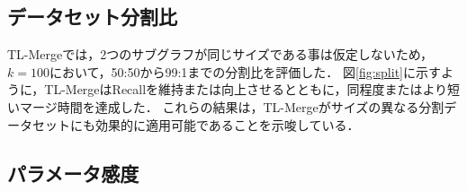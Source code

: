 \documentclass[submit,techrep,noauthor]{ipsj}
\begin{document}
\subsection{データセット分割比}
\label{subsec:split}
TL-Mergeでは，2つのサブグラフが同じサイズである事は仮定しないため，$k=100$において，50:50から99:1までの分割比を評価した．
図\ref{fig:split}に示すように，TL-MergeはRecallを維持または向上させるとともに，同程度またはより短いマージ時間を達成した．
これらの結果は，TL-Mergeがサイズの異なる分割データセットにも効果的に適用可能であることを示唆している．

\subsection{パラメータ感度}
\label{subsec:params}


\end{document}
